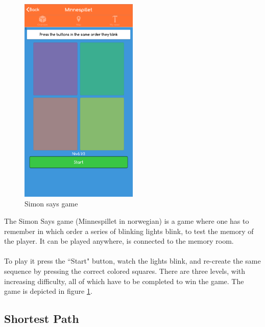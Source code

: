 \begin{figure}[H]
    \centering
    \includegraphics[width=0.5\textwidth]{images/app/Minnespillet.png}
    \caption{Simon says game}
    \label{fig:Minnespillet}
\end{figure}

The Simon Says game (Minnespillet in  norwegian) is a game where one has to remember in which order a series of blinking lights blink, to test the memory of the player. It can be played anywhere, is connected to the memory room.\\\\
To play it press the ``Start" button, watch the lights blink, and re-create the same sequence by pressing the correct colored squares. There are three levels, with increasing difficulty, all of which have to be completed to win the game. The game is depicted in figure \ref{fig:Minnespillet}.

\subsection{Shortest Path}

